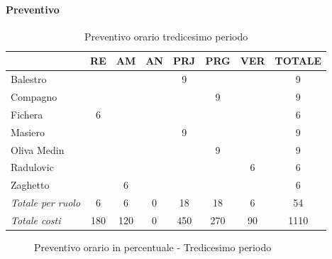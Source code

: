 \documentclass[a4paper,12pt]{article}
\begin{document}
            \paragraph{Preventivo}
                \begin{table}[H]
                \centering
                \caption{Preventivo orario tredicesimo periodo}
                \begin{tabular}{|l|c|c|c|c|c|c|c|}
                \hline
                    \rowcolor{lightgray}{\textbf{Membro}} & {\textbf{RE}} & {\textbf{AM}} & {\textbf{AN}} & {\textbf{PRJ}} & {\textbf{PRG}} & {\textbf{VER}} & {\textbf{TOTALE}}\\
                \hline
                    Balestro & & & & 9 & & & 9\\
                \hline
                    Compagno & & & & & 9 & & 9\\
                \hline
                    Fichera & 6 & & & & & & 6\\
                \hline
                    Masiero & & & & 9 & & & 9\\
                \hline
                    Oliva Medin & & & & & 9 & & 9\\
                \hline
                    Radulovic & & & & & & 6 & 6\\
                \hline
                    Zaghetto & & 6 & & & & & 6\\
                \hline
                    \rowcolor{lightgray}\textit{Totale per ruolo} & 6 & 6 & 0 & 18 & 18 & 6 & 54\\
                \hline
                    \rowcolor{lightgray}\textit{Totale costi} & 180 & 120 & 0 & 450 & 270 & 90 & 1110\\
                \hline
                \end{tabular}
                \end{table}

                \begin{figure}[H]
                \centering
                \caption{Preventivo orario in percentuale - Tredicesimo periodo}
                \end{figure}
                
\end{document}
